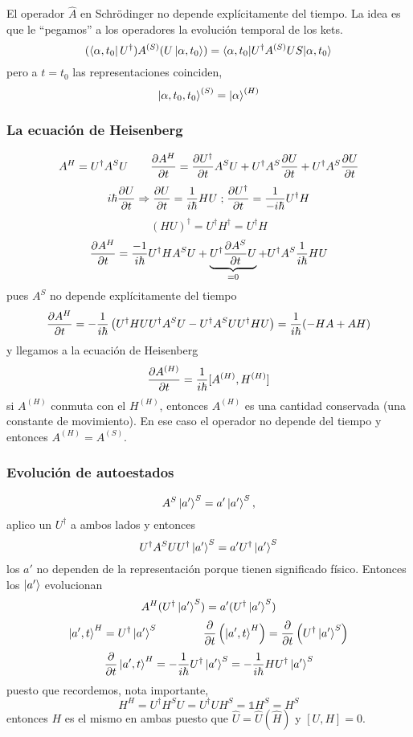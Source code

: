 \documentclass[10pt,oneside]{CBFT_book}
\begin{document}
El operador $\hat{A}$ en Schrödinger no depende explícitamente del tiempo. La idea es que le ``pegamos'' a los 
operadores la evolución temporal de los kets.
\[
	(\Bra{ \alpha, t_0 } U^\dagger) A^{(S)} (U \Ket{\alpha, t_0 }) = 
	\braket{ \alpha, t_0 | U^\dagger A^{(S)} US | \alpha, t_0 }
\]
pero a $t=t_0$ las representaciones coinciden,
\[
	\Ket{\alpha,t_0,t_0}^{(S)} = \Ket{\alpha}^{(H)}
\]

\subsubsection{La ecuación de Heisenberg}

\[
	A^H = U^\dagger A^S U \qquad \frac{\partial^{\hspace{-0.05em}} {A^H}}{\partial {t}^{\hspace{-0.05em}}} = \frac{\partial^{\hspace{-0.05em}} {U^\dagger}}{\partial {t}^{\hspace{-0.05em}}}A^S U + U^\dagger A^S \frac{\partial^{\hspace{-0.05em}} {U}}{\partial {t}^{\hspace{-0.05em}}} +
	U^\dagger A^S \frac{\partial^{\hspace{-0.05em}} {U}}{\partial {t}^{\hspace{-0.05em}}}
\]
\[
	i\hbar \frac{\partial^{\hspace{-0.05em}} {U}}{\partial {t}^{\hspace{-0.05em}}} \Rightarrow  \frac{\partial^{\hspace{-0.05em}} {U}}{\partial {t}^{\hspace{-0.05em}}} = \frac{1}{i\hbar}HU \; \text{;} \;
	\frac{\partial^{\hspace{-0.05em}} {U^\dagger}}{\partial {t}^{\hspace{-0.05em}}} = \frac{1}{-i\hbar}U^\dagger H
\]
\[
	(HU)^\dagger = U^\dagger H^\dagger = U^\dagger H 
\]
\[
	\frac{\partial^{\hspace{-0.05em}} {A^H}}{\partial {t}^{\hspace{-0.05em}}} = \frac{-1}{i\hbar} U^\dagger H A^S U + \underbrace{U^\dagger\frac{\partial^{\hspace{-0.05em}} {A^S}}{\partial {t}^{\hspace{-0.05em}}} U}_{=0} +
	U^\dagger A^S \frac{1}{i\hbar} H U
\]
pues $A^S$ no depende explícitamente del tiempo
\[
	\frac{\partial^{\hspace{-0.05em}} {A^H}}{\partial {t}^{\hspace{-0.05em}}} = -\frac{1}{i\hbar} \left( U^\dagger HUU^\dagger A^SU -U^\dagger A^S U U^\dagger 
	HU \right) =	\frac{1}{i\hbar}(-HA + AH)
\]
y llegamos a la ecuación de Heisenberg
\[
	\frac{\partial^{\hspace{-0.05em}} {A^{(H)}}}{\partial {t}^{\hspace{-0.05em}}} = \frac{1}{i\hbar} [ A^{(H)}, H^{(H)}]
\]
si $A^{(H)}$ conmuta con el $H^{(H)}$, entonces $A^{(H)}$ es una cantidad conservada (una constante de movimiento).
En ese caso el operador no depende del tiempo y entonces $A^{(H)} = A^{(S)}$.

\subsubsection{Evolución de autoestados}

\[
	A^S \Ket{a'}^S = a' \Ket{a'}^S,
\]
aplico un $U^\dagger$ a ambos lados y entonces 
\[
	U^\dagger A^S UU^\dagger \Ket{a'}^S = a' U^\dagger \Ket{a'}^S
\]
los $a'$ no dependen de la representación porque tienen significado físico. Entonces los $\Ket{a'}$ evolucionan
\[
	A^H (U^\dagger\Ket{a'}^S) = a' (U^\dagger\Ket{a'}^S)
\]
\[
	\Ket{a',t}^H = U^\dagger \Ket{a'}^S \qquad \qquad \frac{\partial^{\hspace{-0.05em}} {}}{\partial {t}^{\hspace{-0.05em}}}\left( \Ket{a',t}^H \right) = 
	\frac{\partial^{\hspace{-0.05em}} {}}{\partial {t}^{\hspace{-0.05em}}} \left( U^\dagger \Ket{a'}^S \right)
\]
\[
	\frac{\partial^{\hspace{-0.05em}} {}}{\partial {t}^{\hspace{-0.05em}}}\Ket{a',t}^H = -\frac{1}{i\hbar} U^\dagger \Ket{a'}^S =  -\frac{1}{i\hbar} H U^\dagger 
	\Ket{a'}^S
\]
puesto que recordemos, nota importante,
\[
	H^H = U^\dagger H^S U = U^\dagger U H^S = \mathbb{1}H^S = H^S
\]
entonces $H$ es el mismo en ambas puesto que $\hat{U} =\hat{U}(\hat{H})$ y $[U,H]=0$.
\end{document}
